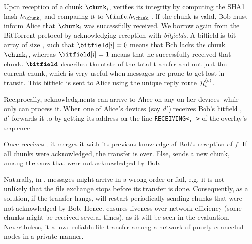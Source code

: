 Upon reception of a chunk $\chunk_i$, \recdevice verifies its integrity by computing the SHA1 hash $h_{\chunk_i}$ and comparing it to $\finfo.h_{\chunk_i}$.
If the chunk is valid, Bob must inform Alice that $\chunk_i$ was successfully received.
We borrow again from the BitTorrent protocol by acknowledging reception with \emph{bitfields}.
A bitfield \bitfield is bit-array of size \nchunks, such that $\bitfield[i] = 0$ means that Bob lacks the chunk $\chunk_i$, whereas $\bitfield[i] = 1$ means that he successfully received that chunk.
$\bitfield$ describes the state of the total transfer and not just the current chunk, which is very useful when messages are prone to get lost in transit. 
This bitfield is sent to Alice using the unique reply route $\mathcal{H}^{(b)}_i$.


Reciprocally, acknowledgments can arrive to Alice on any on her devices, while only \sendingdevice can process it.
When one of Alice's devices (say $d'$) receives Bob's bitfield \bitfield, 
$d'$ forwards it to \sendingdevice by getting its address on the line \texttt{RECEIVING<\sendingdevice, \fileid>} of the \squad overlay's sequence.


Once \sendingdevice receives \bitfield, it merges it with its previous knowledge of Bob's reception of $f$.
If all chunks were acknowledged, the transfer is over.
Else, \sendingdevice sends a new chunk, among the ones that were not acknowledged by Bob.


Naturally, in \name, messages might arrive in a wrong order or fail, e.g.
it is not unlikely that the file exchange stops before its transfer is done.
Consequently, as a solution, if the transfer hangs, \sendingdevice will restart periodically sending chunks that were not acknowledged by Bob.
Hence, \name ensures liveness over network efficiency (some chunks might be received several times), as it will be seen in the evaluation.
Nevertheless, it allows reliable file transfer among a network of poorly connected nodes in a private manner.